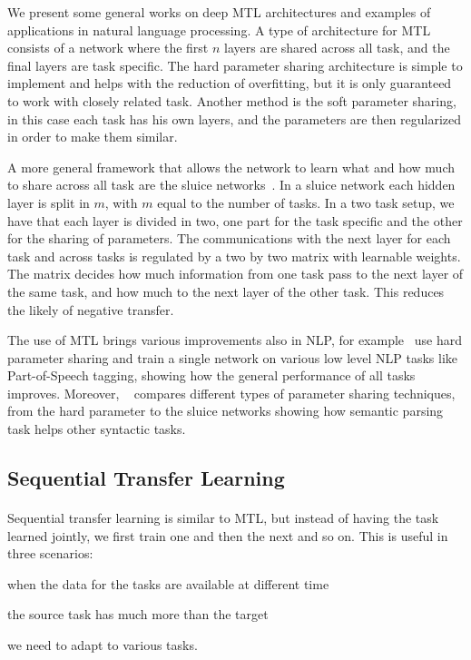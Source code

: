 We present some general works on deep MTL architectures and examples of applications in natural language processing. A type of architecture for MTL consists of a network where the first $n$ layers are shared across all task, and the final layers are task specific. The hard parameter sharing architecture is simple to implement and helps with the reduction of overfitting, but it is only guaranteed to work with closely related task. Another method is the soft parameter sharing, in this case each task has his own layers, and the parameters are then regularized in order to make them similar. 

A more general framework that allows the network to learn what and how much to share across all task are the sluice networks~\citep{ruder2017sluice}. In a sluice network each hidden layer is split in $m$, with $m$ equal to the number of tasks. In a two task setup, we have that each layer is divided in two, one part for the task specific and the other for the sharing of parameters. The communications with the next layer for each task and across tasks is regulated by a two by two matrix with learnable weights. The matrix decides how much information from one task pass to the next layer of the same task, and how much to the next layer of the other task. This reduces the likely of negative transfer.

The use of MTL brings various improvements also in NLP, for example~\cite{collobert2008a} use hard parameter sharing and train a single network on various low level NLP tasks like Part-of-Speech tagging, showing how the general performance of all tasks improves. Moreover, ~\cite{abdou2018semanticmtl} compares different types of parameter sharing techniques, from the hard parameter to the sluice networks showing how semantic parsing task helps other syntactic tasks.


\subsection{Sequential Transfer Learning}
\paragraph{}
Sequential transfer learning is similar to MTL, but instead of having the task learned jointly, we first train one and then the next and so on. This is useful in three scenarios: \begin{enumerate*}[a)]
  \item when the data for the tasks are available at different time
  \item the source task has much more than the target
  \item we need to adapt to various tasks.
\end{enumerate*}

